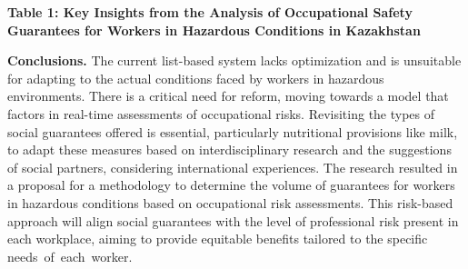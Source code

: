 
{\bfseries Table 1: Key Insights from the Analysis of Occupational Safety
Guarantees for Workers in Hazardous Conditions in Kazakhstan}

{\bfseries Conclusions.} The current list-based system lacks optimization
and is unsuitable for adapting to the actual conditions faced by workers
in hazardous environments. There is a critical need for reform, moving
towards a model that factors in real-time assessments of occupational
risks. Revisiting the types of social guarantees offered is essential,
particularly nutritional provisions like milk, to adapt these measures
based on interdisciplinary research and the suggestions of social
partners, considering international experiences. The research resulted
in a proposal for a methodology to determine the volume of guarantees
for workers in hazardous conditions based on occupational risk
assessments. This risk-based approach will align social guarantees with
the level of professional risk present in each workplace, aiming to
provide equitable benefits tailored to the specific
needs~of~each~worker.

